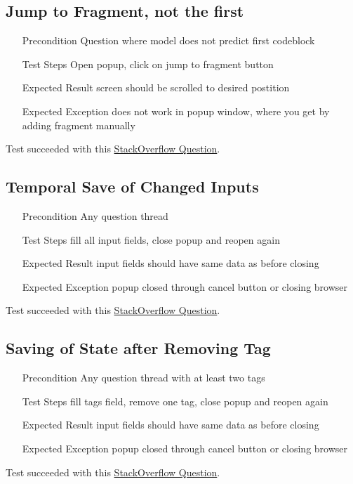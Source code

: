 \documentclass{report}
\begin{document}
\subsection*{Jump to Fragment, not the first}
\begin{itemize}
	\item[Precondition] Question where model does not predict first codeblock
	\item[Test Steps] Open popup, click on jump to fragment button
	\item[Expected Result] screen should be scrolled to desired postition
	\item[Expected Exception] does not work in popup window, where you get by adding fragment manually
\end{itemize}
Test succeeded with this \href{https://stackoverflow.com/questions/221294/how-do-you-get-a-timestamp-in-javascript?rq=1}{StackOverflow Question}.

\subsection*{Temporal Save of Changed Inputs}
\begin{itemize}
	\item[Precondition] Any question thread
	\item[Test Steps] fill all input fields, close popup and reopen again
	\item[Expected Result] input fields should have same data as before closing
	\item[Expected Exception] popup closed through cancel button or closing browser
\end{itemize}
Test succeeded with this \href{https://stackoverflow.com/questions/221294/how-do-you-get-a-timestamp-in-javascript?rq=1}{StackOverflow Question}.


\subsection*{Saving of State after Removing Tag}
\begin{itemize}
	\item[Precondition] Any question thread with at least two tags
	\item[Test Steps] fill tags field, remove one tag, close popup and reopen again
	\item[Expected Result] input fields should have same data as before closing
	\item[Expected Exception] popup closed through cancel button or closing browser
\end{itemize}
Test succeeded with this \href{https://stackoverflow.com/questions/221294/how-do-you-get-a-timestamp-in-javascript?rq=1}{StackOverflow Question}.
\end{document}
